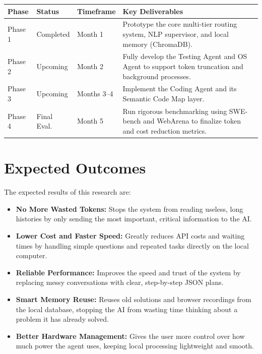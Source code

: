 \begin{center}
\renewcommand{\arraystretch}{1.3}
\begin{tabular}{|l|l|l|p{}|}
\hline
\textbf{Phase} & \textbf{Status} & \textbf{Timeframe} & \textbf{Key Deliverables} \\
\hline
Phase 1 & Completed & Month 1 & Prototype the core multi-tier routing system, NLP supervisor, and local memory (ChromaDB). \\
\hline
Phase 2 & Upcoming & Month 2 & Fully develop the Testing Agent and OS Agent to support token truncation and background processes. \\
\hline
Phase 3 & Upcoming & Months 3--4 & Implement the Coding Agent and its Semantic Code Map layer. \\
\hline
Phase 4 & Final Eval. & Month 5 & Run rigorous benchmarking using SWE-bench and WebArena to finalize token and cost reduction metrics. \\
\hline
\end{tabular}
\end{center}

\section{Expected Outcomes}
The expected results of this research are:\\
\begin{itemize}
    \item \textbf{No More Wasted Tokens:} Stops the system from reading useless, long histories by only sending the most important, critical information to the AI.
    \item \textbf{Lower Cost and Faster Speed:} Greatly reduces API costs and waiting times by handling simple questions and repeated tasks directly on the local computer.
    \item \textbf{Reliable Performance:} Improves the speed and trust of the system by replacing messy conversations with clear, step-by-step JSON plans.
    \item \textbf{Smart Memory Reuse:} Reuses old solutions and browser recordings from the local database, stopping the AI from wasting time thinking about a problem it has already solved.
    \item \textbf{Better Hardware Management:} Gives the user more control over how much power the agent uses, keeping local processing lightweight and smooth.
\end{itemize}
